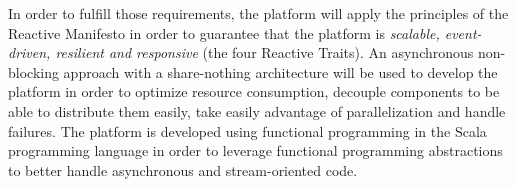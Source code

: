 In order to fulfill those requirements, the platform will apply the principles of the Reactive Manifesto  in order to guarantee
that the platform is \textit{scalable, event-driven, resilient and responsive} (the four Reactive Traits). An asynchronous non-blocking approach with a share-nothing architecture will be used to develop the platform in order to optimize resource consumption, decouple components to be able to distribute them easily, take easily advantage of parallelization and handle failures. 
The platform is developed using functional programming in the Scala programming language  in order to leverage functional programming abstractions to better handle asynchronous and stream-oriented code.
\\

